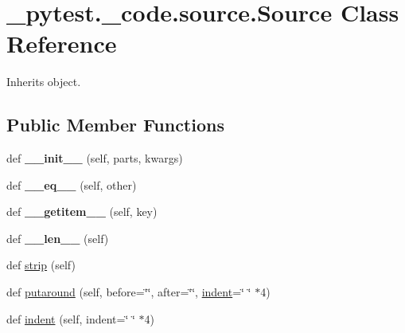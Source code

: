 \hypertarget{class__pytest_1_1__code_1_1source_1_1_source}{}\section{\+\_\+pytest.\+\_\+code.\+source.\+Source Class Reference}
\label{class__pytest_1_1__code_1_1source_1_1_source}


Inherits object.

\subsection*{Public Member Functions}
\begin{DoxyCompactItemize}
\item 
\mbox{\label{class__pytest_1_1__code_1_1source_1_1_source_a5860e553908822fae6168e12c5230447}} 
def {\bfseries \+\_\+\+\_\+init\+\_\+\+\_\+} (self, parts, kwargs)
\item 
\mbox{\label{class__pytest_1_1__code_1_1source_1_1_source_a50d26dd004c0433b8461ce2d334bd10c}} 
def {\bfseries \+\_\+\+\_\+eq\+\_\+\+\_\+} (self, other)
\item 
\mbox{\label{class__pytest_1_1__code_1_1source_1_1_source_a9e100fb593b6e272e50ad4a424fe40b0}} 
def {\bfseries \+\_\+\+\_\+getitem\+\_\+\+\_\+} (self, key)
\item 
\mbox{\label{class__pytest_1_1__code_1_1source_1_1_source_a1dc23de7c51f35ac17fabf512f3b32cd}} 
def {\bfseries \+\_\+\+\_\+len\+\_\+\+\_\+} (self)
\item 
def \hyperlink{class__pytest_1_1__code_1_1source_1_1_source_ad993e2ff059420bab5e5f3a4c237c21c}{strip} (self)
\item 
def \hyperlink{class__pytest_1_1__code_1_1source_1_1_source_a6711d31f585b6d407ab89a5103201af1}{putaround} (self, before=\char`\"{}\char`\"{}, after=\char`\"{}\char`\"{}, \hyperlink{class__pytest_1_1__code_1_1source_1_1_source_a24be56f21f626ab1028e982244738ec6}{indent}=\char`\"{} \char`\"{} $\ast$4)
\item 
def \hyperlink{class__pytest_1_1__code_1_1source_1_1_source_a24be56f21f626ab1028e982244738ec6}{indent} (self, indent=\char`\"{} \char`\"{} $\ast$4)

\end{DoxyCompactItemize}
